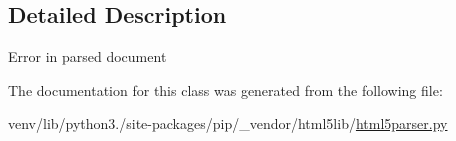 \subsection{Detailed Description}
\begin{DoxyVerb}Error in parsed document\end{DoxyVerb}
 

The documentation for this class was generated from the following file\+:\begin{DoxyCompactItemize}
\item 
venv/lib/python3./site-\/packages/pip/\+\_\+vendor/html5lib/\hyperlink{html5parser_8py}{html5parser.\+py}\end{DoxyCompactItemize}

